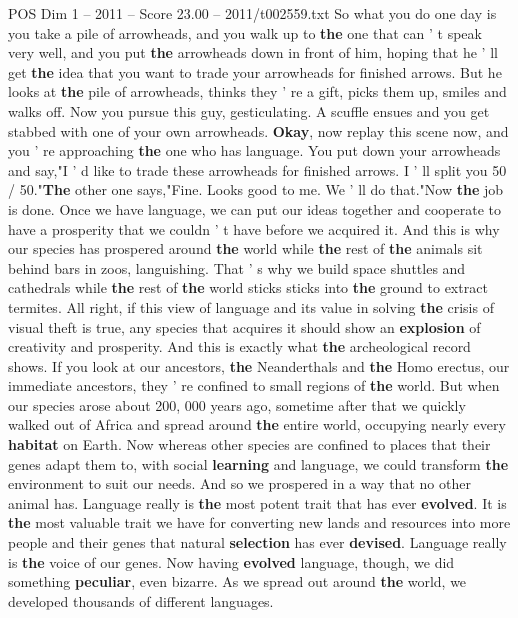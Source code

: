 \begin{textsample}{POS Dim 1 – 2011 – Score 23.00 – 2011/t002559.txt}
So what you do one day is you take a pile of arrowheads, and you walk up to \textbf{the} one that can ' t speak very well, and you put \textbf{the} arrowheads down in front of him, hoping that he ' ll get \textbf{the} idea that you want to trade your arrowheads for finished arrows.
But he looks at \textbf{the} pile of arrowheads, thinks they ' re a gift, picks them up, smiles and walks off.
Now you pursue this guy, gesticulating.
A scuffle ensues and you get stabbed with one of your own arrowheads. \textbf{Okay}, now replay this scene now, and you ' re approaching \textbf{the} one who has language.
You put down your arrowheads and say,"I ' d like to trade these arrowheads for finished arrows.
I ' ll split you 50 / 50."\textbf{The} other one says,"Fine.
Looks good to me.
We ' ll do that."Now \textbf{the} job is done.
Once we have language, we can put our ideas together and cooperate to have a prosperity that we couldn ' t have before we acquired it.
And this is why our species has prospered around \textbf{the} world while \textbf{the} rest of \textbf{the} animals sit behind bars in zoos, languishing.
That ' s why we build space shuttles and cathedrals while \textbf{the} rest of \textbf{the} world sticks sticks into \textbf{the} ground to extract termites.
All right, if this view of language and its value in solving \textbf{the} crisis of visual theft is true, any species that acquires it should show an \textbf{explosion} of creativity and prosperity.
And this is exactly what \textbf{the} archeological record shows.
If you look at our ancestors, \textbf{the} Neanderthals and \textbf{the} Homo erectus, our immediate ancestors, they ' re confined to small regions of \textbf{the} world.
But when our species arose about 200, 000 years ago, sometime after that we quickly walked out of Africa and spread around \textbf{the} entire world, occupying nearly every \textbf{habitat} on Earth.
Now whereas other species are confined to places that their genes adapt them to, with social \textbf{learning} and language, we could transform \textbf{the} environment to suit our needs.
And so we prospered in a way that no other animal has.
Language really is \textbf{the} most potent trait that has ever \textbf{evolved}.
It is \textbf{the} most valuable trait we have for converting new lands and resources into more people and their genes that natural \textbf{selection} has ever \textbf{devised}.
Language really is \textbf{the} voice of our genes.
Now having \textbf{evolved} language, though, we did something \textbf{peculiar}, even bizarre.
As we spread out around \textbf{the} world, we developed thousands of different languages.

\end{textsample}

